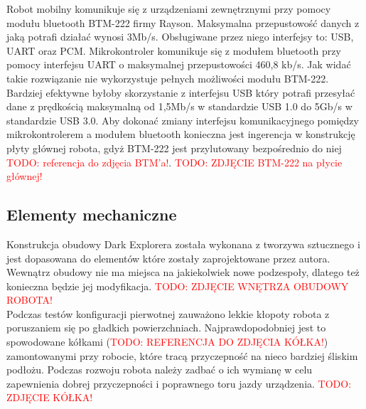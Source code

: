 Robot mobilny komunikuje się z urządzeniami zewnętrznymi przy pomocy modułu bluetooth BTM-222 firmy Rayson. Maksymalna przepustowość danych z jaką potrafi działać wynosi 3Mb/s. Obsługiwane przez niego interfejsy to: USB, UART oraz PCM. Mikrokontroler komunikuje się z modułem bluetooth przy pomocy interfejsu UART o maksymalnej przepustowości 460,8 kb/s. Jak widać takie rozwiązanie nie wykorzystuje pełnych możliwości modułu BTM-222. Bardziej efektywne byłoby skorzystanie z interfejsu USB który potrafi przesyłać dane z prędkością maksymalną od 1,5Mb/s w standardzie USB 1.0 do 5Gb/s w standardzie USB 3.0. Aby dokonać zmiany interfejsu komunikacyjnego pomiędzy mikrokontrolerem a modułem bluetooth konieczna jest ingerencja w konstrukcję płyty głównej robota, gdyż BTM-222 jest przylutowany bezpośrednio do niej \textcolor{red}{TODO: referencja do zdjęcia BTM'a!}.
\textcolor{red}{TODO: ZDJĘCIE BTM-222 na płycie głównej!}

\subsection{Elementy mechaniczne}
Konstrukcja obudowy Dark Explorera została wykonana z tworzywa sztucznego i jest dopasowana do elementów które zostały zaprojektowane przez autora. Wewnątrz obudowy nie ma miejsca na jakiekolwiek nowe podzespoły, dlatego też konieczna będzie jej modyfikacja.
\textcolor{red}{TODO: ZDJĘCIE WNĘTRZA OBUDOWY ROBOTA!}
\\

Podczas testów konfiguracji pierwotnej zauważono lekkie kłopoty robota z poruszaniem się po gładkich powierzchniach. Najprawdopodobniej jest to spowodowane kółkami (\textcolor{red}{TODO: REFERENCJA DO ZDJĘCIA KÓŁKA!}) zamontowanymi przy robocie, które tracą przyczepność na nieco bardziej śliskim podłożu. Podczas rozwoju robota należy zadbać o ich wymianę w celu zapewnienia dobrej przyczepności i poprawnego toru jazdy urządzenia.
\textcolor{red}{TODO: ZDJĘCIE KÓŁKA!}